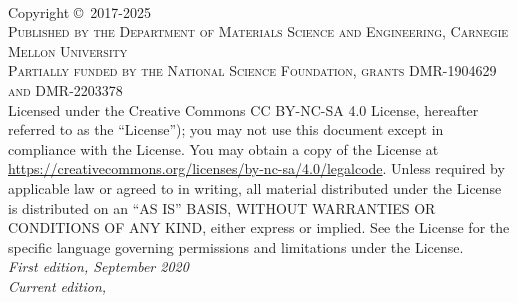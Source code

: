 
\newpage
~\vfill
\thispagestyle{empty}

\noindent Copyright \copyright\ 2017-2025\\ %

\noindent \textsc{Published by the Department of Materials Science and Engineering, Carnegie Mellon University}\\ %

\noindent \textsc{Partially funded by the National Science Foundation, grants DMR-1904629 and DMR-2203378}\\ 


\noindent Licensed under the Creative Commons CC BY-NC-SA 4.0 License, hereafter referred to as the ``License''); you may not
use this document except in compliance with the License. You may obtain a copy
of the License at \url{https://creativecommons.org/licenses/by-nc-sa/4.0/legalcode}. Unless
required by applicable law or agreed to in writing, all material distributed
under the License is distributed on an ``AS IS'' BASIS, WITHOUT
WARRANTIES OR CONDITIONS OF ANY KIND, either express or implied. See the
License for the specific language governing permissions and limitations
under the License.\\ %

\noindent \textit{First edition, September 2020}\\ %
\noindent \textit{Current edition, \monthyear}

\clearpage
\processauthors

\clearpage

